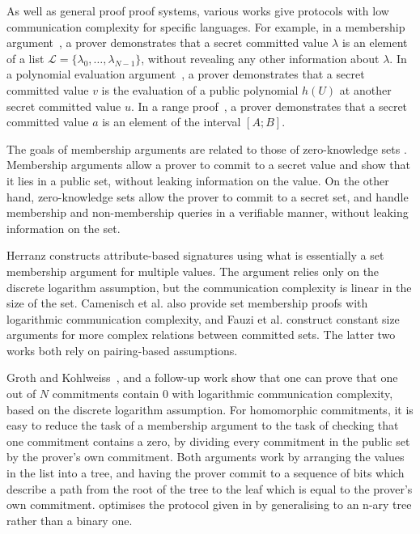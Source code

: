 As well as general proof proof systems, various works give protocols with low communication complexity for specific languages. For example, in a membership argument~\cite{BS01,BDD07}, a prover demonstrates that a secret committed value $\lambda$ is an element of a list $\mathcal{L} = \{ \lambda_0,\ldots,\lambda_{N-1}\}$, without revealing any other information about $\lambda$. In a polynomial evaluation argument~\cite{FO97,BDD07}, a prover demonstrates that a secret committed value $v$ is the evaluation of a public polynomial $h(U)$ at another secret committed value $u$. In a range proof~\cite{Bou02,Lip03}, a prover demonstrates that a secret committed value $a$ is an element of the interval $[A;B]$.

The goals of membership arguments are related to those of zero-knowledge sets \cite{Micali}. Membership arguments allow a prover to commit to a secret value and show that it lies in a public set, without leaking information on the value. On the other hand, zero-knowledge sets allow the prover to commit to a secret set, and handle membership and non-membership queries in a verifiable manner, without leaking information on the set.

Herranz constructs attribute-based signatures \cite{Herranz} using what is essentially a set membership argument for multiple values. The argument relies only on the discrete logarithm assumption, but the communication complexity is linear in the size of the set. Camenisch et al. \cite{Camenisch2008} also provide set membership proofs with logarithmic communication complexity, and Fauzi et al. \cite{Fauzi2014} construct constant size arguments for more complex relations between committed sets. The latter two works both rely on pairing-based assumptions.

Groth and Kohlweiss~\cite{GrothK15}, and a follow-up work \cite{BootleCCGGP15} show that one can prove that one out of $N$ commitments contain $0$ with logarithmic communication complexity, based on the discrete logarithm assumption. For homomorphic commitments, it is easy to reduce the task of a membership argument to the task of checking that one commitment contains a zero, by dividing every commitment in the public set by the prover's own commitment. Both arguments work by arranging the values in the list into a tree, and having the prover commit to a sequence of bits which describe a path from the root of the tree to the leaf which is equal to the prover's own commitment. \cite{BootleCCGGP15} optimises the protocol given in \cite{GrothK15} by generalising to an n-ary tree rather than a binary one.

